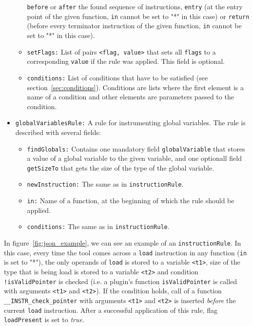 \begin{itemize}
\begin{itemize}
      \texttt{before} or \texttt{after} the found sequence of instructions,
      \texttt{entry} (at the entry point of the given function, \texttt{in}
      cannot be set to "*" in this case) or \texttt{return} (before every
      terminator instruction of the given function, \texttt{in} cannot be set to
      "*" in this case).
    \item \texttt{setFlags:} List of pairs \texttt{<flag, value>} that sets
      all \texttt{flags} to a corresponding \texttt{value} if the rule was
      applied. This field is optional.
    \item \texttt{conditions:} List of conditions that have to be satisfied
    (see section~\ref{sec:conditions}). Conditions are lists where the first
    element is a name of a condition and other elements are parameters passed
    to the condition.
  \end{itemize}
\item \texttt{globalVariablesRule:} A rule for instrumenting global
  variables. The rule is described with several fields:
  \begin{itemize}
    \item \texttt{findGlobals:} Contains one mandatory field
    \texttt{globalVariable} that stores a value of a global variable to the
    given variable, and one optionall field \texttt{getSizeTo} that gets the
    size of the type of the global variable.
    \item \texttt{newInstruction:} The same as in \texttt{instructionRule}.
    \item \texttt{in:} Name of a function, at the beginning of which the rule
    should be applied.
    \item \texttt{conditions:} The same as in \texttt{instructionRule}.

  \end{itemize}

\end{itemize}

In figure~\ref{fig:json_example}, we can see an example of an
\texttt{instructionRule}. In this case, every time the tool comes across a
\texttt{load} instruction in any function (\texttt{in} is set to "*"), the only
operands of \texttt{load} is stored to a variable \texttt{<t1>}, size of the
type that is being load is stored to a variable \texttt{<t2>} and condition
\texttt{!isValidPointer} is checked (i.e. a plugin's function
\texttt{isValidPointer} is called with arguments \texttt{<t1>} and
\texttt{<t2>}). If the condition holds, call of a function
\texttt{\_\_INSTR\_check\_pointer} with arguments \texttt{<t1>} and
\texttt{<t2>} is inserted \emph{before} the current \texttt{load} instruction.
After a successful application of this rule, flag \texttt{loadPresent} is set
to \emph{true}.

